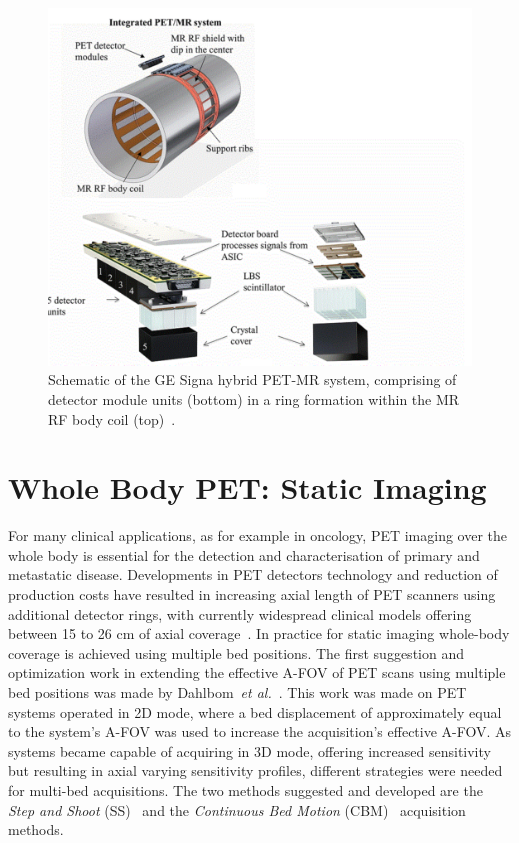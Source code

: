 \begin{figure} [ht!]
\centering
\includegraphics[scale=0.45,angle=0]{2_Theory_Methods/figures/SignaPETMR_Integrated_System.pdf}
\caption[Schematic of the GE Signa hybrid PET-MR system, comprising of detector module units (bottom) in a ring formation within the MR RF body coil (top).]{Schematic of the GE Signa hybrid PET-MR system, comprising of detector module units (bottom) in a ring formation within the MR RF body coil (top)~\cite{Levin2016}.} 
\label{fig_2:SignaPETMR_Integrated_System}
\end{figure} 

\section{Whole Body PET: Static Imaging}
For many clinical applications, as for example in oncology, PET imaging over the whole body is essential for the detection and characterisation of primary and metastatic disease. Developments in PET detectors technology and reduction of production costs have resulted in increasing axial length of PET scanners using additional detector rings, with currently widespread clinical models offering between 15 to 26 cm of axial coverage~\cite{Vandenberghe2020}.
In practice for static imaging whole-body coverage is achieved using multiple bed positions. The first suggestion and optimization work in extending the effective A-FOV of PET scans using multiple bed positions was made by Dahlbom~\textit{et al.}~\cite{Dahlbom1992}. This work was made on PET systems operated in 2D mode, where a bed displacement of approximately equal to the system's A-FOV was used to increase the acquisition's effective A-FOV. As systems became capable of acquiring in 3D mode, offering increased sensitivity but resulting in axial varying sensitivity profiles, different strategies were needed for multi-bed acquisitions. The two methods suggested and developed are the \textit{Step and Shoot} (SS)~\cite{Schubert1996} and the \textit{Continuous Bed Motion} (CBM)~\cite{Panin2014} acquisition methods.


